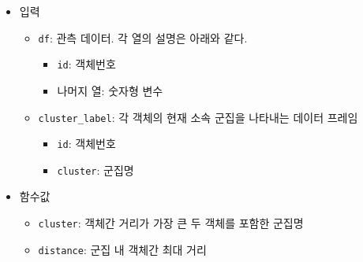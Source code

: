 \documentclass[
]{book}
\providecommand{\tightlist}{%
  \setlength{\itemsep}{0pt}\setlength{\parskip}{0pt}}
\begin{document}
\begin{itemize}
\tightlist
\item
  입력

  \begin{itemize}
  \tightlist
  \item
    \texttt{df}: 관측 데이터. 각 열의 설명은 아래와 같다.

    \begin{itemize}
    \tightlist
    \item
      \texttt{id}: 객체번호
    \item
      나머지 열: 숫자형 변수
    \end{itemize}
  \item
    \texttt{cluster\_label}: 각 객체의 현재 소속 군집을 나타내는 데이터 프레임

    \begin{itemize}
    \tightlist
    \item
      \texttt{id}: 객체번호
    \item
      \texttt{cluster}: 군집명
    \end{itemize}
  \end{itemize}
\item
  함수값

  \begin{itemize}
  \tightlist
  \item
    \texttt{cluster}: 객체간 거리가 가장 큰 두 객체를 포함한 군집명
  \item
    \texttt{distance}: 군집 내 객체간 최대 거리
  \end{itemize}
\end{itemize}
\end{document}
